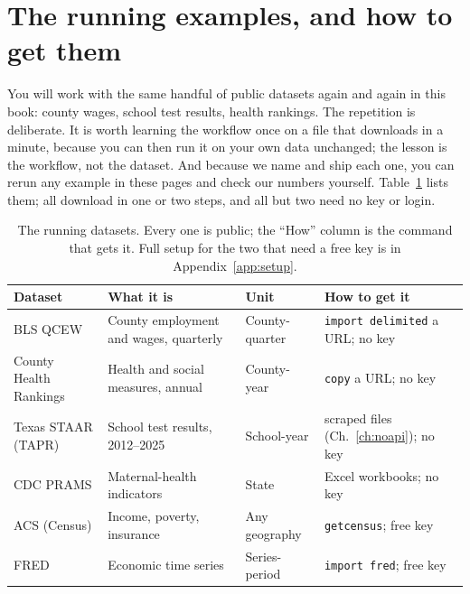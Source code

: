 \section{The running examples, and how to get them}
You will work with the same handful of public datasets again and again in this book: county wages, school test results, health rankings. The repetition is deliberate. It is worth learning the workflow once on a file that downloads in a minute, because you can then run it on your own data unchanged; the lesson is the workflow, not the dataset. And because we name and ship each one, you can rerun any example in these pages and check our numbers yourself. Table~\ref{tab:data} lists them; all download in one or two steps, and all but two need no key or login.

\begin{table}[htbp]
\centering
\footnotesize
\caption[The book's running datasets]{The running datasets. Every one is public; the ``How'' column is the command that gets it. Full setup for the two that need a free key is in Appendix~\ref{app:setup}.}
\label{tab:data}
\begin{tabular}{@{}p{2.5cm}p{3.4cm}p{2.1cm}p{3.0cm}@{}}
\hline
\textbf{Dataset} & \textbf{What it is} & \textbf{Unit} & \textbf{How to get it} \\
\hline
BLS QCEW & County employment and wages, quarterly & County-quarter & \texttt{import delimited} a URL; no key \\
County Health Rankings & Health and social measures, annual & County-year & \texttt{copy} a URL; no key \\
Texas STAAR (TAPR) & School test results, 2012--2025 & School-year & scraped files (Ch.~\ref{ch:noapi}); no key \\
CDC PRAMS & Maternal-health indicators & State & Excel workbooks; no key \\
ACS (Census) & Income, poverty, insurance & Any geography & \texttt{getcensus}; free key \\
FRED & Economic time series & Series-period & \texttt{import fred}; free key \\
\hline
\end{tabular}
\end{table}

